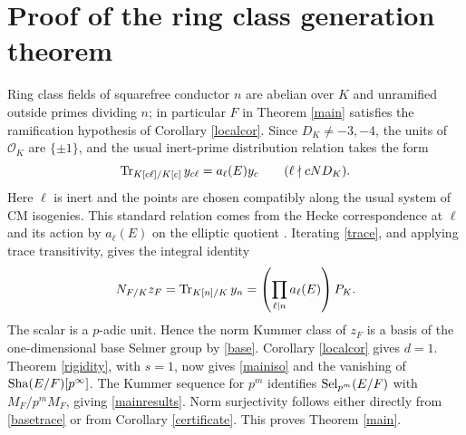\documentclass[11pt,a4paper]{article}
\numberwithin{equation}{section}
\begin{document}
\section{Proof of the ring class generation theorem}\label{proofmain}
Ring class fields of squarefree conductor $n$ are abelian over $K$ and unramified outside primes dividing $n$; in particular $F$ in Theorem \ref{main} satisfies the ramification hypothesis of Corollary \ref{localcor}. Since $D_K\ne-3,-4$, the units of $\mathcal O_K$ are $\{\pm1\}$, and the usual inert-prime distribution relation takes the form
\begin{equation}\label{trace}
\operatorname{Tr}_{K[c\ell]/K[c]}y_{c\ell}=a_\ell(E)y_c\qquad(\ell\nmid cND_K).
\end{equation}
Here $\ell$ is inert and the points are chosen compatibly along the usual system of CM isogenies. This standard relation comes from the Hecke correspondence at $\ell$ and its action by $a_\ell(E)$ on the elliptic quotient \cite{BD,Gross}. Iterating \eqref{trace}, and applying trace transitivity, gives the integral identity
\begin{equation}\label{basetrace}
N_{F/K}z_F=\operatorname{Tr}_{K[n]/K}y_n=\left(\prod_{\ell\mid n}a_\ell(E)\right)P_K.
\end{equation}
The scalar is a $p$-adic unit. Hence the norm Kummer class of $z_F$ is a basis of the one-dimensional base Selmer group by \eqref{base}. Corollary \ref{localcor} gives $d=1$. Theorem \ref{rigidity}, with $s=1$, now gives \eqref{mainiso} and the vanishing of $\operatorname{Sha}(E/F)[p^\infty]$. The Kummer sequence for $p^m$ identifies $\operatorname{Sel}_{p^m}(E/F)$ with $M_F/p^mM_F$, giving \eqref{mainresults}. Norm surjectivity follows either directly from \eqref{basetrace} or from Corollary \ref{certificate}. This proves Theorem \ref{main}.
\end{document}

